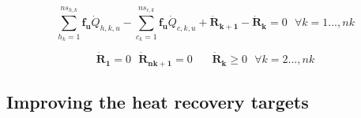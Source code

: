 \begin{equation}
 \label{eq:heat-cascade}
\sum_{h_k=1}^{ns_{h,k}}{\boldsymbol {f_u} \dot{Q}_{h,k,u}} - \sum_{c_k=1}^{ns_{c,k}}{\boldsymbol {f_u} \dot{Q}_{c,k,u} } +\boldsymbol {\dot{R}_{k+1}}  -\boldsymbol {\dot{R}_{k}}   = 0
~~~\forall k=1...,nk
\end{equation}



\begin{equation}
\label{eq:Rk-constraints}
\boldsymbol {\dot{R}_{1}} = 0 ~~~ \boldsymbol {\dot{R}_{nk+1}}=0 ~~~~~~~~ \boldsymbol {\dot{R}_{k}} \geq 0 ~~~\forall k=2...,nk
\end{equation}

\subsection{Improving the heat recovery targets}
\label{sec:TSIheatrecovery}

